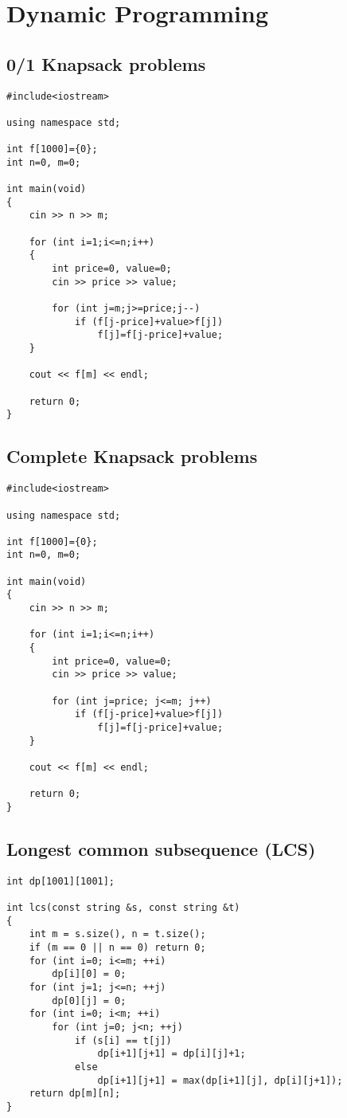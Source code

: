 \documentclass[a4paper]{article}
\begin{document}
\section{Dynamic Programming}

\subsection{0/1 Knapsack problems}

\begin{verbatim}
#include<iostream>

using namespace std;

int f[1000]={0};
int n=0, m=0;

int main(void)
{
	cin >> n >> m;

	for (int i=1;i<=n;i++)
	{
		int price=0, value=0;
		cin >> price >> value;

		for (int j=m;j>=price;j--)
			if (f[j-price]+value>f[j])
				f[j]=f[j-price]+value;
	}

	cout << f[m] << endl;

	return 0;
}
\end{verbatim}

\subsection{Complete Knapsack problems}

\begin{verbatim}
#include<iostream>

using namespace std;

int f[1000]={0};
int n=0, m=0;

int main(void)
{
	cin >> n >> m;

	for (int i=1;i<=n;i++)
	{
		int price=0, value=0;
		cin >> price >> value;

		for (int j=price; j<=m; j++)
			if (f[j-price]+value>f[j])
				f[j]=f[j-price]+value;
	}

	cout << f[m] << endl;

	return 0;
}
\end{verbatim}

\subsection{Longest common subsequence (LCS)}
\begin{verbatim}
int dp[1001][1001];

int lcs(const string &s, const string &t)
{
	int m = s.size(), n = t.size();
	if (m == 0 || n == 0) return 0;
	for (int i=0; i<=m; ++i)
		dp[i][0] = 0;
	for (int j=1; j<=n; ++j)
		dp[0][j] = 0;
	for (int i=0; i<m; ++i)
		for (int j=0; j<n; ++j)
			if (s[i] == t[j])
        		dp[i+1][j+1] = dp[i][j]+1;
        	else
        		dp[i+1][j+1] = max(dp[i+1][j], dp[i][j+1]);
	return dp[m][n];
}
\end{verbatim}
\end{document}
